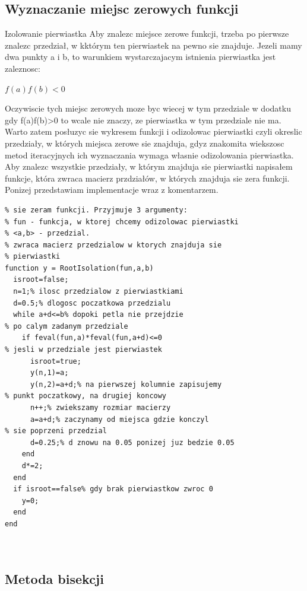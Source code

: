 \documentclass[11pt, oneside]{article}   	%
\begin{document}
\subsection{Wyznaczanie miejsc zerowych funkcji}
Izolowanie pierwiastka Aby znalezc miejsce zerowe funkcji, trzeba po pierwsze
znalezc przedział, w kktórym ten pierwiastek na pewno sie znajduje. Jezeli
mamy dwa punkty a i b, to warunkiem wystarczajacym istnienia pierwiastka
jest zaleznosc:
\begin{center}
	$f(a)f(b)<0$
\end{center}
Oczywiscie tych miejsc zerowych moze byc wiecej w tym przedziale w dodatku
gdy f(a)f(b)>0 to wcale nie znaczy, ze pierwiastka w tym przedziale nie ma.
Warto zatem posłuzyc sie wykresem funkcji i odizolowac pierwiastki czyli okreslic
przedziały, w których miejsca zerowe sie znajduja, gdyz znakomita wiekszosc
metod iteracyjnych ich wyznaczania wymaga własnie odizolowania pierwiastka.
Aby znalezc wszystkie przedziały, w którym znajduja sie pierwiastki napisałem
funkcje, która zwraca macierz przdziałów, w których znajduja sie zera funkcji.
Ponizej przedstawiam implementacje wraz z komentarzem.
\begin{lstlisting}[caption=Implementacja RootIsolation]
% funkcja znajduje przedzialy, w ktorych znajduja 
% sie zeram funkcji. Przyjmuje 3 argumenty:
% fun - funkcja, w ktorej chcemy odizolowac pierwiastki
% <a,b> - przedzial.
% zwraca macierz przedzialow w ktorych znajduja sie 
% pierwiastki
function y = RootIsolation(fun,a,b)
  isroot=false;
  n=1;% ilosc przedzialow z pierwiastkiami 
  d=0.5;% dlogosc poczatkowa przedzialu
  while a+d<=b% dopoki petla nie przejdzie 
% po calym zadanym przedziale
    if feval(fun,a)*feval(fun,a+d)<=0
% jesli w przedziale jest pierwiastek
      isroot=true;
      y(n,1)=a;
      y(n,2)=a+d;% na pierwszej kolumnie zapisujemy 
% punkt poczatkowy, na drugiej koncowy
      n++;% zwiekszamy rozmiar macierzy
      a=a+d;% zaczynamy od miejsca gdzie konczyl 
% sie poprzeni przedzial
      d=0.25;% d znowu na 0.05 ponizej juz bedzie 0.05
    end
    d*=2;
  end
  if isroot==false% gdy brak pierwiastkow zwroc 0
    y=0;
  end
end

	
\end{lstlisting}



\subsection{Metoda bisekcji}
\end{document}
